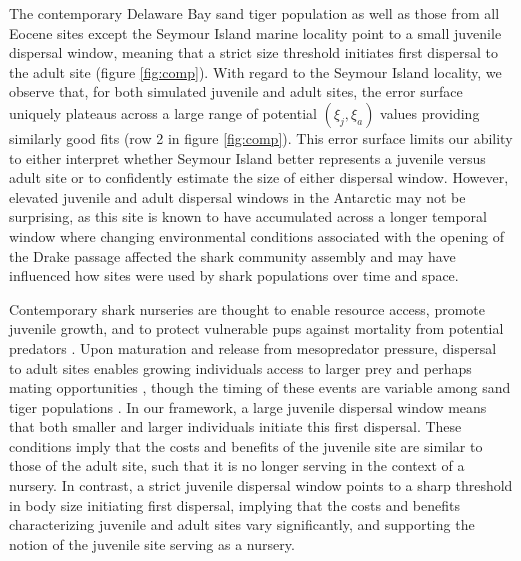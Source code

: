 \documentclass[]{rsos}%
\begin{document}
The contemporary Delaware Bay sand tiger population as well as those from all Eocene sites except the Seymour Island marine locality point to a small juvenile dispersal window, meaning that a strict size threshold initiates first dispersal to the adult site (figure \ref{fig:comp}).
With regard to the Seymour Island locality, we observe that, for both simulated juvenile and adult sites, the error surface uniquely plateaus across a large range of potential $(\xi_j,\xi_a)$ values providing similarly good fits (row 2 in figure \ref{fig:comp}).
This error surface limits our ability to either interpret whether Seymour Island better represents a juvenile versus adult site or to confidently estimate the size of either dispersal window.
However, elevated juvenile and adult dispersal windows in the Antarctic may not be surprising, as this site is known to have accumulated across a longer temporal window \cite{montes2019late} where changing environmental conditions associated with the opening of the Drake passage \cite{Kim2020, zhu2020simulation} affected the shark community assembly \cite{Kriwet2016} and may have influenced how sites were used by shark populations over time and space.


Contemporary shark nurseries are thought to enable resource access, promote juvenile growth, and to protect vulnerable pups against mortality from potential predators \cite{heithaus2007nursery, heupel2007shark}.
Upon maturation and release from mesopredator pressure, dispersal to adult sites enables growing individuals access to larger prey and perhaps mating opportunities \cite{jorgensen2012eating}, though the timing of these events are variable among sand tiger populations \cite{Teter2015, otway2011pop}.
In our framework, a large juvenile dispersal window means that both smaller and larger individuals initiate this first dispersal.
These conditions imply that the costs and benefits of the juvenile site are similar to those of the adult site, such that it is no longer serving in the context of a nursery.
In contrast, a strict juvenile dispersal window points to a sharp threshold in body size initiating first dispersal, implying that the costs and benefits characterizing juvenile and adult sites vary significantly, and supporting the notion of the juvenile site serving as a nursery. %
\end{document}
